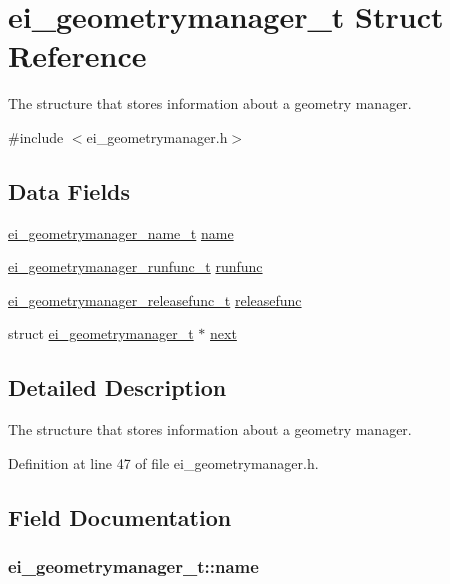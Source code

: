 \hypertarget{structei__geometrymanager__t}{\section{ei\-\_\-geometrymanager\-\_\-t Struct Reference}
\label{structei__geometrymanager__t}
}


The structure that stores information about a geometry manager.  




{\ttfamily \#include $<$ei\-\_\-geometrymanager.\-h$>$}

\subsection*{Data Fields}
\begin{DoxyCompactItemize}
\item 
\hyperlink{ei__geometrymanager_8h_af4774cf9094dc50890c3b767481d6336}{ei\-\_\-geometrymanager\-\_\-name\-\_\-t} \hyperlink{structei__geometrymanager__t_a35b158e8d1493f9dba541a85818d2824}{name}
\item 
\hyperlink{ei__geometrymanager_8h_a29270ac9786c3b30b385c473671311af}{ei\-\_\-geometrymanager\-\_\-runfunc\-\_\-t} \hyperlink{structei__geometrymanager__t_a49ab7a4f7b357bdd515a8e7affccdba0}{runfunc}
\item 
\hyperlink{ei__geometrymanager_8h_a66a8ffc0df10cdc7accb921fbed8a930}{ei\-\_\-geometrymanager\-\_\-releasefunc\-\_\-t} \hyperlink{structei__geometrymanager__t_adb7afc019219b29a9751b56da5a23b93}{releasefunc}
\item 
struct \hyperlink{structei__geometrymanager__t}{ei\-\_\-geometrymanager\-\_\-t} $\ast$ \hyperlink{structei__geometrymanager__t_a5ac5b387d05d2fd7dcb81bb1572a2200}{next}
\end{DoxyCompactItemize}


\subsection{Detailed Description}
The structure that stores information about a geometry manager. 

Definition at line 47 of file ei\-\_\-geometrymanager.\-h.



\subsection{Field Documentation}
\hypertarget{structei__geometrymanager__t_a35b158e8d1493f9dba541a85818d2824}{
\subsubsection[{name}]{ ei\-\_\-geometrymanager\-\_\-t\-::name}}\label{structei__geometrymanager__t_a35b158e8d1493f9dba541a85818d2824}


